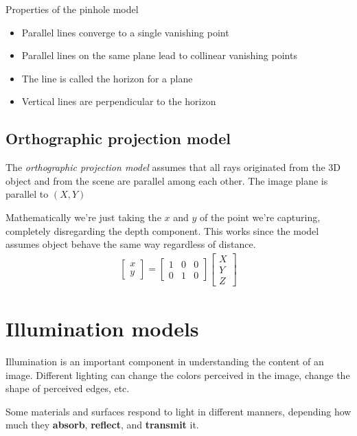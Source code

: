 \documentclass{article}
\begin{document}
Properties of the pinhole model
\begin{itemize}
    \item Parallel lines converge to a single vanishing point
    \item Parallel lines on the same plane lead to collinear vanishing points
    \item The line is called the horizon for a plane
    \item Vertical lines are perpendicular to the horizon
\end{itemize}

\subsection{Orthographic projection model}
The \textit{orthographic projection model} assumes that all rays originated from the 3D object and from the scene are parallel among each other.
The image plane is parallel to $(X, Y)$

Mathematically we're just taking the $x$ and $y$ of the point we're capturing, completely disregarding the depth component. This works since the model assumes object behave the same way regardless of distance.
\begin{align*}
    \left[
    \begin{array}{c}
        x\\ y
    \end{array}
\right] 
    = 
    \left[
    \begin{array}{ccc}
        1 &0&0\\0&1&0
    \end{array}
\right] 
    \left[
    \begin{array}{c}
        X\\ Y\\ Z
    \end{array}
\right] 
\end{align*}

\section{Illumination models}
Illumination is an important component in understanding the content of an image. Different lighting can change the colors perceived in the image, change the shape of perceived edges, etc.

Some materials and surfaces respond to light in different manners, depending how much they \textbf{absorb}, \textbf{reflect}, and \textbf{transmit} it.
\end{document}

